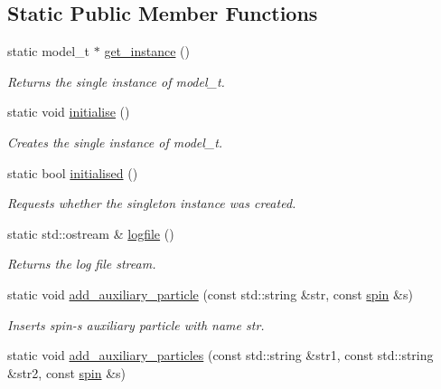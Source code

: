 \subsection*{Static Public Member Functions}
\begin{DoxyCompactItemize}
\item 
static model\-\_\-t $\ast$ \hyperlink{a00370_addb0565969863861ecfb72877717b1e6}{get\-\_\-instance} ()
\begin{DoxyCompactList}\small\item\em Returns the single instance of model\-\_\-t. \end{DoxyCompactList}\item 
static void \hyperlink{a00370_aac3264ce0db5925641f695c1b0fdfcac}{initialise} ()
\begin{DoxyCompactList}\small\item\em Creates the single instance of model\-\_\-t. \end{DoxyCompactList}\item 
\hypertarget{a00370_ab917e4ae26df6441d5edbb4a18009610}{static bool \hyperlink{a00370_ab917e4ae26df6441d5edbb4a18009610}{initialised} ()}\label{a00370_ab917e4ae26df6441d5edbb4a18009610}

\begin{DoxyCompactList}\small\item\em Requests whether the singleton instance was created. \end{DoxyCompactList}\item 
\hypertarget{a00370_ac4c8696fff15e80f82dbc71b0fad5f0c}{static std\-::ostream \& \hyperlink{a00370_ac4c8696fff15e80f82dbc71b0fad5f0c}{logfile} ()}\label{a00370_ac4c8696fff15e80f82dbc71b0fad5f0c}

\begin{DoxyCompactList}\small\item\em Returns the log file stream. \end{DoxyCompactList}\item 
static void \hyperlink{a00370_a37ba372a5b17bbb43840f2f195b7622d}{add\-\_\-auxiliary\-\_\-particle} (const std\-::string \&str, const \hyperlink{a00501}{spin} \&s)
\begin{DoxyCompactList}\small\item\em Inserts spin-\/s auxiliary particle with name str. \end{DoxyCompactList}\item 
\hypertarget{a00370_a029fc5fabfc31ac9f3cd71420c2302d7}{static void \hyperlink{a00370_a029fc5fabfc31ac9f3cd71420c2302d7}{add\-\_\-auxiliary\-\_\-particles} (const std\-::string \&str1, const std\-::string \&str2, const \hyperlink{a00501}{spin} \&s)}\label{a00370_a029fc5fabfc31ac9f3cd71420c2302d7}


\end{DoxyCompactItemize}
